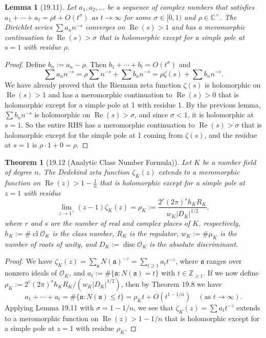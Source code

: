\documentclass[UTF8,11pt]{ctexart}
\newtheorem*{theorem}{Theorem}
\newtheorem*{lemma}{Lemma}
\theoremstyle{definition}
\newcommand{\C}{\mathbb C}
\newcommand{\Z}{\mathbb Z}
\begin{document}
\begin{lemma}[19.11]
Let $a_1,a_2,\ldots$ be a sequence of complex numbers that satisfies $a_1+\cdots+a_t=\rho t+O(t^\sigma)$ as $t\to\infty$ for some $\sigma\in[0,1)$ and $\rho\in\C^\times$. The Dirichlet series $\sum a_nn^{-s}$ converges on $\operatorname{Re}(s)>1$ and has a meromorphic continuation to $\operatorname{Re}(s)>\sigma$ that is holomorphic except for a simple pole at $s=1$ with residue $\rho$.
\end{lemma}
\begin{proof}
Define $b_n:=a_n-\rho$. Then $b_1+\cdots+b_t=O(t^\sigma)$ and
\[
\sum a_nn^{-s}=\rho\sum n^{-s}+\sum b_nn^{-s}=\rho\zeta(s)+\sum b_nn^{-s}.
\]
We have already proved that the Riemann zeta function $\zeta(s)$ is holomorphic on $\operatorname{Re}(s)>1$ and has a meromorphic continuation to $\operatorname{Re}(s)>0$ that is holomorphic except for a simple pole at 1 with residue 1. By the previous lemma, $\sum b_nn^{-s}$ is holomorphic on $\operatorname{Re}(s)>\sigma$, and since $\sigma<1$, it is holomorphic at $s=1$. So the entire RHS has a meromorphic continuation to $\operatorname{Re}(s)>\sigma$ that is holomorphic except for the simple pole at 1 coming from $\zeta(s)$, and the residue at $s=1$ is $\rho\cdot1+0=\rho$.
\end{proof}
\begin{theorem}[19.12 (Analytic Class Number Formula)]
Let $K$ be a number field of degree $n$. The Dedekind zeta function $\zeta_K(z)$ extends to a meromorphic function on $\operatorname{Re}(z)>1-\frac1n$ that is holomorphic except for a simple pole at $z=1$ with residue
\[
\lim_{z\to1^+}(z-1)\zeta_K(z)=\rho_K:=\frac{2^r(2\pi)^sh_KR_K}{w_K|D_K|^{1/2}},
\]
where $r$ and $s$ are the number of real and complex places of $K$, respectively, $h_K:=\#\operatorname{cl}\mathcal O_K$ is the class number, $R_K$ is the regulator, $w_K:=\#\mu_K$ is the number of roots of unity, and $D_K:=\operatorname{disc}\mathcal O_K$ is the absolute discriminant.
\end{theorem}
\begin{proof}
We have $\zeta_K(z)=\sum_{\mathfrak a}N(\mathfrak a)^{-z}=\sum_{t\geq1}a_tt^{-z}$, where $\mathfrak a$ ranges over nonzero ideals of $\mathcal O_K$, and $a_t:=\#\{\mathfrak a:N(\mathfrak a)=t\}$ with $t\in\Z_{\geq1}$. If we now define $\rho_K:=2^r(2\pi)^sh_KR_K/(w_K|D_K|^{1/2})$, then by Theorem 19.8 we have
\[
a_1+\cdots+a_t=\#\{\mathfrak a:N(\mathfrak a)\leq t\}=\rho_Kt+O(t^{1-1/n})\quad(\text{as }t\to\infty).
\]
Applying Lemma 19.11 with $\sigma=1-1/n$, we see that $\zeta_K(z)=\sum a_tt^{-z}$ extends to a meromorphic function on $\operatorname{Re}(z)>1-1/n$ that is holomorphic except for a simple pole at $z=1$ with residue $\rho_K$.
\end{proof}
\end{document}
